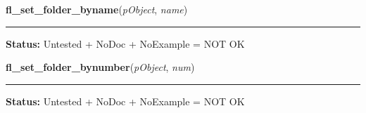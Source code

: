     \label{xformslib:library:fl_set_folder_byname}

    \vspace{0.5ex}

\hspace{.8\funcindent}\begin{boxedminipage}{\funcwidth}

    \raggedright \textbf{fl\_set\_folder\_byname}(\textit{pObject}, \textit{name})

    \vspace{-1.5ex}

    \rule{\textwidth}{0.5\fboxrule}
\setlength{\parskip}{2ex}
\setlength{\parskip}{1ex}
\textbf{Status:} Untested + NoDoc + NoExample = NOT OK



    \end{boxedminipage}

    \label{xformslib:library:fl_set_folder_bynumber}

    \vspace{0.5ex}

\hspace{.8\funcindent}\begin{boxedminipage}{\funcwidth}

    \raggedright \textbf{fl\_set\_folder\_bynumber}(\textit{pObject}, \textit{num})

    \vspace{-1.5ex}

    \rule{\textwidth}{0.5\fboxrule}
\setlength{\parskip}{2ex}
\setlength{\parskip}{1ex}
\textbf{Status:} Untested + NoDoc + NoExample = NOT OK



    \end{boxedminipage}

    \label{xformslib:library:fl_get_folder}

    \vspace{0.5ex}

